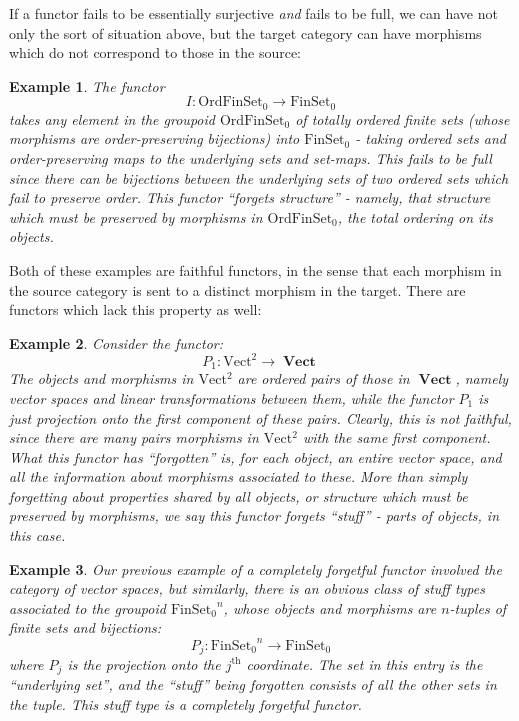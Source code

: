 \documentclass{amsart} \usepackage{amsmath,amssymb,bbm}
\newcommand{\opname}[1]{\operatorname{#1}}
\newcommand{\catname}[1]{\boldsymbol{\opname{{#1}}}}
\newcommand{\FSN}{\catname{FinSet_0}}
\newtheorem{varexample}{Example}
\newenvironment{example}{\begin{varexample}\em}{\em\end{varexample}}
\begin{document}
If a functor fails to be essentially surjective \textit{and} fails to be full,
we can have not only the sort of situation above, but the target category can
have morphisms which do not correspond to those in the source:

\begin{example}
  The functor \[ I : \catname{OrdFinSet_0} \rightarrow \FSN \] takes
  any element in the groupoid $\catname{OrdFinSet_0}$ of totally
  ordered finite sets (whose morphisms are order-preserving
  bijections) into $\FSN$ - taking ordered sets and order-preserving
  maps to the underlying sets and set-maps.  This fails to be full
  since there can be bijections between the underlying sets of two
  ordered sets which fail to preserve order.  This functor ``forgets
  structure'' - namely, that structure which must be preserved by
  morphisms in $\catname{OrdFinSet_0}$, the total ordering on its
  objects.
\end{example}

Both of these examples are faithful functors, in the sense that each morphism
in the source category is sent to a distinct morphism in the target.  There
are functors which lack this property as well:

\begin{example}
  Consider the functor: \[ P_1 : \catname{Vect^2} \rightarrow
  \catname{Vect} \] The objects and morphisms in $\catname{Vect^2}$
  are ordered pairs of those in $\catname{Vect}$, namely vector spaces
  and linear transformations between them, while the functor $P_1$ is
  just projection onto the first component of these pairs.  Clearly,
  this is not faithful, since there are many pairs morphisms in
  $\catname{Vect^2}$ with the same first component.  What this functor
  has ``forgotten'' is, for each object, an entire vector space, and
  all the information about morphisms associated to these.  More than
  simply forgetting about properties shared by all objects, or
  structure which must be preserved by morphisms, we say this functor
  forgets ``stuff'' - parts of objects, in this case.
\end{example}

\begin{example}
  \label{st-ex:tuple}Our previous example of a completely forgetful
  functor involved the category of vector spaces, but similarly, there
  is an obvious class of stuff types associated to the groupoid
  $\FSN^n$, whose objects and morphisms are $n$-tuples of finite sets
  and bijections:
  \[ 
     P_j : \FSN^n \rightarrow \FSN
  \]
  where $P_j$ is the projection onto the $j^{\opname{th}}$ coordinate.
  The set in this entry is the ``underlying set'', and the ``stuff''
  being forgotten consists of all the other sets in the tuple.  This
  stuff type is a completely forgetful functor.
\end{example}
\end{document}
